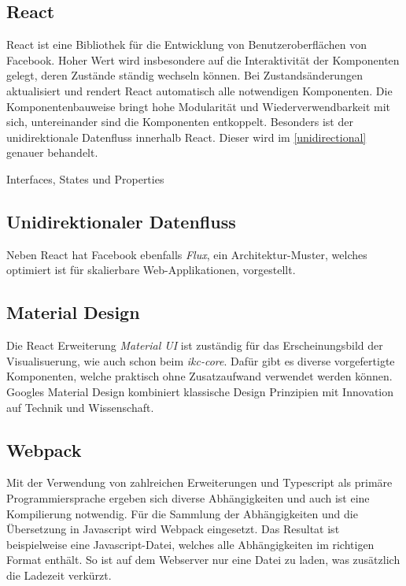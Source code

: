 \subsection{React}

React ist eine Bibliothek für die Entwicklung von Benutzeroberflächen von Facebook. Hoher Wert wird insbesondere auf die Interaktivität der Komponenten gelegt, deren Zustände ständig wechseln können. Bei Zustandsänderungen aktualisiert und rendert React automatisch alle notwendigen Komponenten. Die Komponentenbauweise bringt hohe Modularität und Wiederverwendbarkeit mit sich, untereinander sind die Komponenten entkoppelt. Besonders ist der uni\-di\-rek\-tio\-nale Datenfluss innerhalb React. Dieser wird im \autoref{unidirectional} genauer behandelt.

Interfaces, States und Properties

\cite{reactjs, reactjs-blog}

\subsection[Datenfluss]{Unidirektionaler Datenfluss}\label{unidirectional}

Neben React hat Facebook ebenfalls \textit{Flux}, ein Architektur-Muster, welches optimiert ist für skalierbare Web-Applikationen, vorgestellt.

\subsection{Material Design}

Die React Erweiterung \textit{Material UI} ist zuständig für das Erscheinungsbild der Visualisuerung, wie auch schon beim \textit{ikc-core}. Dafür gibt es diverse vorgefertigte Komponenten, welche praktisch ohne Zusatzaufwand verwendet werden können. Googles Material Design kombiniert klassische Design Prinzipien mit Innovation auf Technik und Wissenschaft. 

\cite{react-material-ui, google-material-ui}

\subsection{Webpack}

Mit der Verwendung von zahlreichen Erweiterungen und Typescript als primäre Programmiersprache ergeben sich diverse Abhängigkeiten und auch ist eine Kompilierung notwendig. Für die Sammlung der Abhängigkeiten und die Übersetzung in Javascript wird Webpack eingesetzt. Das Resultat ist beispielweise eine Javascript-Datei, welches alle Abhängigkeiten im richtigen Format enthält. So ist auf dem Webserver nur eine Datei zu laden, was zusätzlich die Ladezeit verkürzt.

